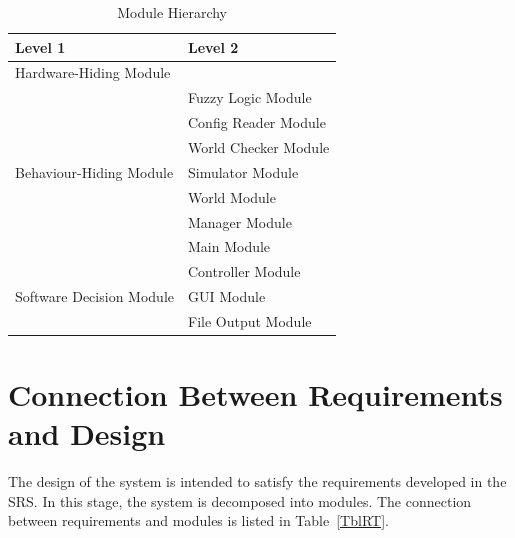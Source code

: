 \documentclass[12pt, titlepage]{article}
\begin{document}
\begin{table}[h!]
\centering
\begin{tabular}{p{} p{}}
\toprule
\textbf{Level 1} & \textbf{Level 2}\\
\midrule

{Hardware-Hiding Module} & ~ \\
\midrule

\multirow{7}{0.3\textwidth}{Behaviour-Hiding Module}
& Fuzzy Logic Module\\
& Config Reader Module\\
& World Checker Module\\
& Simulator Module\\
& World Module\\
& Manager Module\\
& Main Module\\
\midrule

\multirow{3}{0.3\textwidth}{Software Decision Module}
& Controller Module\\
& GUI Module\\
& File Output Module\\
\bottomrule

\end{tabular}
\caption{Module Hierarchy}
\label{TblMH}
\end{table}

\section{Connection Between Requirements and Design} \label{SecConnection}

The design of the system is intended to satisfy the requirements developed in
the SRS. In this stage, the system is decomposed into modules. The connection
between requirements and modules is listed in Table~\ref{TblRT}.

\end{document}
